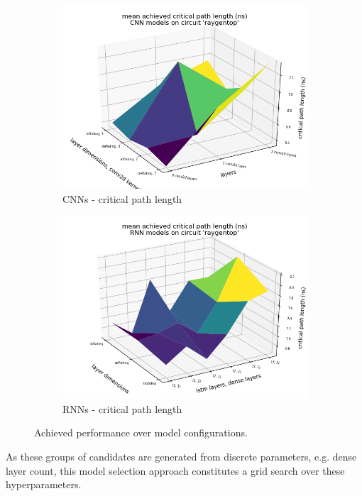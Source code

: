 \begin{figure}
\begin{subfigure}[b]{0.49\linewidth}
		\includegraphics[width=\linewidth]{plots/cnn-hyperopt-critical-path.png}
		\caption{\glspl{CNN} - critical path length}
	\end{subfigure}
	\begin{subfigure}[b]{0.49\linewidth}
		\includegraphics[width=\linewidth]{plots/rnn-hyperopt-critical-path.png}
		\caption{\glspl{RNN} - critical path length}
	\end{subfigure}
	\caption{Achieved performance over model configurations.}
	\label{fig:eval-hyperopt-surface}
\end{figure}

As these groups of candidates are generated from discrete parameters, e.g. dense layer count, this model selection approach constitutes a grid search over these hyperparameters.

